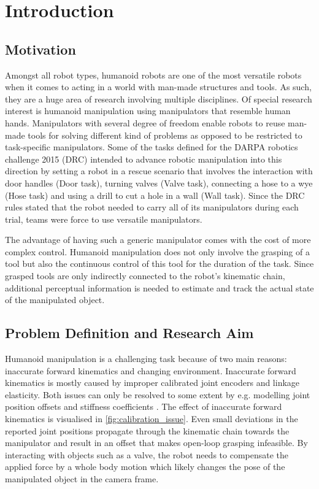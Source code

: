 \chapter{Introduction}

\section{Motivation}

Amongst all robot types, humanoid robots are one of the most versatile robots when it comes to acting in a world with man-made structures and tools. As such, they are a huge area of research involving multiple disciplines. Of special research interest is humanoid manipulation using manipulators that resemble human hands. Manipulators with several degree of freedom enable robots to reuse man-made tools for solving different kind of problems as opposed to be restricted to task-specific manipulators. Some of the tasks defined for the DARPA robotics challenge 2015 (DRC) \cite{DRC2013} intended to advance robotic manipulation into this direction by setting a robot in a rescue scenario that involves the interaction with door handles (Door task), turning valves (Valve task), connecting a hose to a wye (Hose task) and using a drill to cut a hole in a wall (Wall task). Since the DRC rules stated that the robot needed to carry all of its manipulators during each trial, teams were force to use versatile manipulators.

The advantage of having such a generic manipulator comes with the cost of more complex control. Humanoid manipulation does not only involve the grasping of a tool but also the continuous control of this tool for the duration of the task. Since grasped tools are only indirectly connected to the robot's kinematic chain, additional perceptual information is needed to estimate and track the actual state of the manipulated object.


\section{Problem Definition and Research Aim}

Humanoid manipulation is a challenging task because of two main reasons: inaccurate forward kinematics and changing environment.
Inaccurate forward kinematics is mostly caused by improper calibrated joint encoders and linkage elasticity. Both issues can only be resolved to some extent by e.g. modelling joint position offsets \cite{Fallon2015} and stiffness coefficients \cite{Johnson2015}. The effect of inaccurate forward kinematics is visualised in \cref{fig:calibration_issue}. Even small deviations in the reported joint positions propagate through the kinematic chain towards the manipulator and result in an offset that makes open-loop grasping infeasible.
By interacting with objects such as a valve, the robot needs to compensate the applied force by a whole body motion which likely changes the pose of the manipulated object in the camera frame.

